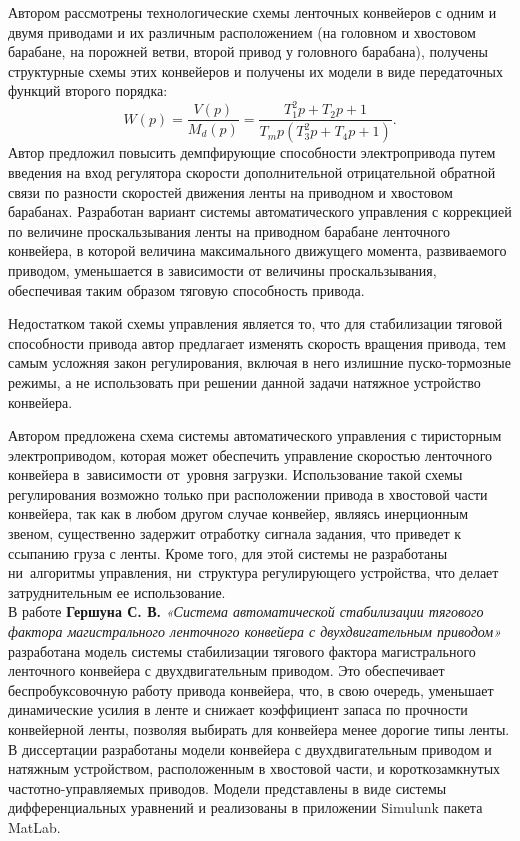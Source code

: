 Автором рассмотрены технологические схемы ленточных конвейеров с одним и двумя приводами и их различным расположением (на головном и хвостовом барабане, на порожней ветви, второй привод у головного барабана), получены структурные схемы этих конвейеров и получены их модели в виде передаточных функций второго порядка:
$$
W(p) = \frac{V(p)}{M_d(p)} = \frac{T_1^2p + T_2p + 1}{T_mp(T_3^2p + T_4p + 1)}.
$$
Автор предложил повысить демпфирующие способности электропривода путем введения на вход регулятора скорости дополнительной отрицательной обратной связи по разности скоростей движения ленты на приводном и хвостовом барабанах. Разработан вариант системы автоматического управления с коррекцией по величине проскальзывания ленты на приводном барабане ленточного конвейера, в которой величина максимального движущего момента, развиваемого приводом, уменьшается в зависимости от величины проскальзывания, обеспечивая таким образом тяговую способность привода.

Недостатком такой схемы управления является то, что для стабилизации тяговой способности привода автор предлагает изменять скорость вращения привода, тем самым усложняя закон регулирования, включая в него излишние пуско-тормозные режимы, а не использовать при решении данной задачи натяжное устройство конвейера. 

Автором предложена схема системы автоматического управления с тиристорным электроприводом, которая может обеспечить управление скоростью ленточного конвейера в~зависимости от~уровня загрузки. Использование такой схемы регулирования возможно только при расположении привода в хвостовой части конвейера, так как в любом другом случае конвейер, являясь инерционным звеном, существенно задержит отработку сигнала задания, что приведет к ссыпанию груза с ленты. Кроме того, для этой системы не разработаны ни~алгоритмы управления, ни~структура регулирующего устройства, что делает затруднительным ее использование.\\

В работе \textbf{Гершуна С. В.} \textit{«Система автоматической стабилизации тягового фактора магистрального ленточного конвейера с двухдвигательным приводом»} \cite{sgershun} разработана модель системы стабилизации тягового фактора магистрального ленточного конвейера с двухдвигательным приводом. Это обеспечивает  беспробуксовочную работу привода конвейера, что, в свою очередь, уменьшает динамические усилия в ленте и снижает коэффициент запаса по прочности конвейерной ленты, позволяя выбирать для конвейера менее дорогие типы ленты. В диссертации разработаны модели конвейера с двухдвигательным приводом и натяжным устройством, расположенным в хвостовой части, и короткозамкнутых частотно-управляемых приводов. Модели представлены в виде системы дифференциальных уравнений и реализованы в приложении Simulunk пакета MatLab. 

